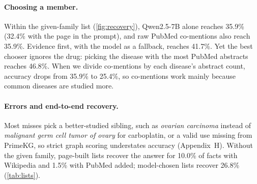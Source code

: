\paragraph{Choosing a member.}
Within the given-family list (\cref{fig:recovery}), Qwen2.5-7B alone reaches 35.9\% (32.4\% with the page in the prompt), and raw PubMed co-mentions also reach 35.9\%. Evidence first, with the model as a fallback, reaches 41.7\%. Yet the best chooser ignores the drug: picking the disease with the most PubMed abstracts reaches 46.8\%. When we divide co-mentions by each disease's abstract count, accuracy drops from 35.9\% to 25.4\%, so co-mentions work mainly because common diseases are studied more.

\paragraph{Errors and end-to-end recovery.}
Most misses pick a better-studied sibling, such as \emph{ovarian carcinoma} instead of \emph{malignant germ cell tumor of ovary} for carboplatin, or a valid use missing from PrimeKG, so strict graph scoring understates accuracy (Appendix~H). Without the given family, page-built lists recover the answer for 10.0\% of facts with Wikipedia and 1.5\% with PubMed added; model-chosen lists recover 26.8\% (\cref{tab:lists}).
